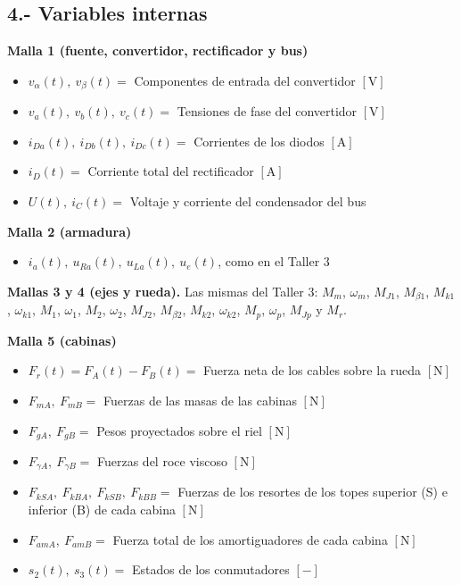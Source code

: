 \documentclass[10pt,a4paper,twocolumn]{article}
\begin{document}
\subsection*{4.- Variables internas}

\noindent\textbf{Malla 1 (fuente, convertidor, rectificador y bus)}
\begin{itemize}
  \item $v_\alpha(t),\ v_\beta(t) =$ Componentes de entrada del convertidor $[\mathrm{V}]$
  \item $v_a(t),\ v_b(t),\ v_c(t) =$ Tensiones de fase del convertidor $[\mathrm{V}]$
  \item $i_{Da}(t),\ i_{Db}(t),\ i_{Dc}(t) =$ Corrientes de los diodos $[\mathrm{A}]$
  \item $i_D(t) =$ Corriente total del rectificador $[\mathrm{A}]$
  \item $U(t),\ i_C(t) =$ Voltaje y corriente del condensador del bus
\end{itemize}

\noindent\textbf{Malla 2 (armadura)}
\begin{itemize}
  \item $i_a(t),\ u_{Ra}(t),\ u_{La}(t),\ u_e(t)$, como en el Taller 3
\end{itemize}

\noindent\textbf{Mallas 3 y 4 (ejes y rueda).} Las mismas del Taller 3: $M_m$,
$\omega_m$, $M_{J1}$, $M_{\beta1}$, $M_{k1}$, $\omega_{k1}$, $M_1$, $\omega_1$, $M_2$,
$\omega_2$, $M_{J2}$, $M_{\beta2}$, $M_{k2}$, $\omega_{k2}$, $M_p$, $\omega_p$, $M_{Jp}$ y
$M_r$.

\noindent\textbf{Malla 5 (cabinas)}
\begin{itemize}
  \item $F_r(t) = F_A(t) - F_B(t) =$ Fuerza neta de los cables sobre la rueda $[\mathrm{N}]$
  \item $F_{mA},\ F_{mB} =$ Fuerzas de las masas de las cabinas $[\mathrm{N}]$
  \item $F_{gA},\ F_{gB} =$ Pesos proyectados sobre el riel $[\mathrm{N}]$
  \item $F_{\gamma A},\ F_{\gamma B} =$ Fuerzas del roce viscoso $[\mathrm{N}]$
  \item $F_{kSA},\ F_{kBA},\ F_{kSB},\ F_{kBB} =$ Fuerzas de los resortes de los topes
        superior (S) e inferior (B) de cada cabina $[\mathrm{N}]$
  \item $F_{amA},\ F_{amB} =$ Fuerza total de los amortiguadores de cada cabina $[\mathrm{N}]$
  \item $s_2(t),\ s_3(t) =$ Estados de los conmutadores $[-]$
\end{itemize}
\end{document}
